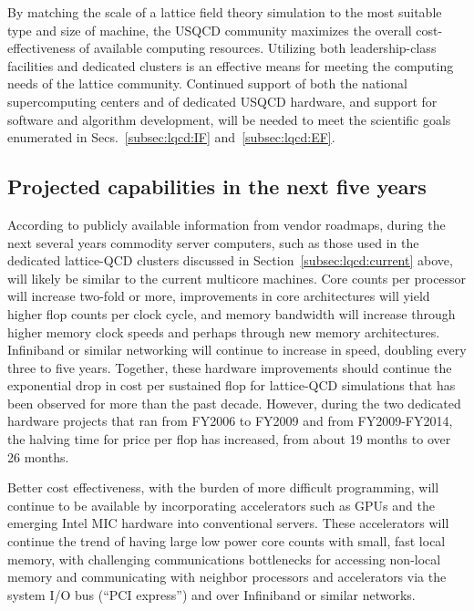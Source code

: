 By matching the scale of a lattice field theory simulation to the most
suitable type and size of machine, the USQCD community maximizes the overall
cost-effectiveness of available computing resources.  Utilizing both
leadership-class facilities and dedicated clusters is an effective means for
meeting the computing needs of the lattice community.  Continued support of
both the national supercomputing centers and of dedicated USQCD hardware, and
support for software and algorithm development, will be needed to meet the
scientific goals enumerated in Secs.~\ref{subsec:lqcd:IF}
and~\ref{subsec:lqcd:EF}.

\subsection{Projected capabilities in the next five years}
\label{subsec:lqcd:fiveyear}

According to publicly available information from vendor roadmaps, during the
next several years commodity server computers, such as those used in the
dedicated lattice-QCD clusters discussed in Section~\ref{subsec:lqcd:current}
above, will likely be similar to the current multicore machines.  Core counts
per processor will increase two-fold or more, improvements in core
architectures will yield higher flop counts per clock cycle, and memory
bandwidth will increase through higher memory clock speeds and perhaps through
new memory architectures.  Infiniband or similar networking will continue to
increase in speed, doubling every three to five years.  Together, these
hardware improvements should continue the exponential drop in cost per
sustained flop for lattice-QCD simulations that has been observed for more
than the past decade.  However, during the two dedicated hardware projects
that ran from FY2006 to FY2009 and from FY2009-FY2014, the halving time for
price per flop has increased, from about 19 months to over 26 months.

Better cost effectiveness, with the burden of more difficult programming, will
continue to be available by incorporating accelerators such as GPUs and the
emerging Intel MIC hardware into conventional servers.  These accelerators
will continue the trend of having large low power core counts with small, fast
local memory, with challenging communications bottlenecks for accessing
non-local memory and communicating with neighbor processors and accelerators
via the system I/O bus (``PCI express'') and over Infiniband or similar
networks.  
 
